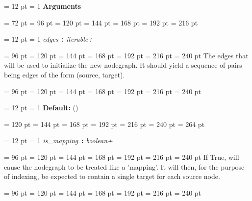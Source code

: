 {{{{{{\par \pagebreak[3.100000] \noindent \hangindent = 12 pt \hangafter = 1 
{\bf Arguments\/}\par}
{\par \noindent  \leftskip = 72 pt  \leftmargini = 96 pt  \leftmarginii = 120 pt  \leftmarginiii = 144 pt  \leftmarginiv = 168 pt  \leftmarginv = 192 pt  \leftmarginvi = 216 pt {\par \noindent
{\par \pagebreak[3.000000] \noindent \hangindent = 12 pt \hangafter = 1 
{\em edges\/}~{\bf :}  {\em iterable+\/}\par}
{\par \noindent  \leftskip = 96 pt  \leftmargini = 120 pt  \leftmarginii = 144 pt  \leftmarginiii = 168 pt  \leftmarginiv = 192 pt  \leftmarginv = 216 pt  \leftmarginvi = 240 pt  The edges that will be used to
         initialize the new nodegraph. It should yield a
         sequence of pairs being edges of the form (source, target).\par}
{\par \noindent  \leftskip = 96 pt  \leftmargini = 120 pt  \leftmarginii = 144 pt  \leftmarginiii = 168 pt  \leftmarginiv = 192 pt  \leftmarginv = 216 pt  \leftmarginvi = 240 pt {\par \noindent
{\par \pagebreak[2.900000] \noindent \hangindent = 12 pt \hangafter = 1 
{\bf Default: \/}()\par}
{\par \noindent  \leftskip = 120 pt  \leftmargini = 144 pt  \leftmarginii = 168 pt  \leftmarginiii = 192 pt  \leftmarginiv = 216 pt  \leftmarginv = 240 pt  \leftmarginvi = 264 pt \par}
\par}
\par}
{\par \pagebreak[3.000000] \noindent \hangindent = 12 pt \hangafter = 1 
{\em is{\_}mapping\/}~{\bf :}  {\em boolean+\/}\par}
{\par \noindent  \leftskip = 96 pt  \leftmargini = 120 pt  \leftmarginii = 144 pt  \leftmarginiii = 168 pt  \leftmarginiv = 192 pt  \leftmarginv = 216 pt  \leftmarginvi = 240 pt  If True, will cause the nodegraph
         to be treated like a 'mapping'. It will then, for the
         purpose of indexing, be expected to contain a single
         target for each source node.\par}
{\par \noindent  \leftskip = 96 pt  \leftmargini = 120 pt  \leftmarginii = 144 pt  \leftmarginiii = 168 pt  \leftmarginiv = 192 pt  \leftmarginv = 216 pt  \leftmarginvi = 240 pt {\par \noindent
}}}}}}}}}
